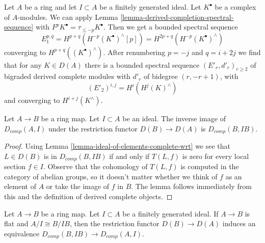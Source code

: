 \begin{example}
\label{example-derived-completion-spectral-sequence}
Let $A$ be a ring and let $I \subset A$ be a finitely generated ideal.
Let $K^\bullet$ be a complex of $A$-modules. We can apply
Lemma \ref{lemma-derived-completion-spectral-sequence}
with $F^pK^\bullet = \tau_{\leq -p}K^\bullet$. Then we get a
bounded spectral sequence
$$
E_1^{p, q} = H^{p + q}(H^{-p}(K^\bullet)^\wedge[p]) =
H^{2p + q}(H^{-p}(K^\bullet)^\wedge)
$$
converging to $H^{p + q}((K^\bullet)^\wedge)$. After renumbering
$p = -j$ and $q = i + 2j$ we find that for any $K \in D(A)$
there is a bounded spectral sequence $(E'_r, d'_r)_{r \geq 2}$
of bigraded derived complete modules with
$d'_r$ of bidegree $(r, -r + 1)$, with
$$
(E'_2)^{i, j} = H^i(H^j(K)^\wedge)
$$
and converging to $H^{i + j}(K^\wedge)$.
\end{example}

\begin{lemma}
\label{lemma-restriction-derived-complete}
Let $A \to B$ be a ring map. Let $I \subset A$ be an ideal. The inverse
image of $D_{comp}(A, I)$ under the restriction functor $D(B) \to D(A)$ is
$D_{comp}(B, IB)$.
\end{lemma}

\begin{proof}
Using Lemma \ref{lemma-ideal-of-elements-complete-wrt}
we see that $L \in D(B)$ is in $D_{comp}(B, IB)$
if and only if $T(L, f)$ is zero for every local section
$f \in I$. Observe that the cohomology of
$T(L, f)$ is computed in the category of abelian groups,
so it doesn't matter whether we think of $f$ as an element of $A$
or take the image of $f$ in $B$.
The lemma follows immediately from this and the
definition of derived complete objects.
\end{proof}

\begin{lemma}
\label{lemma-restriction-derived-complete-equivalence}
Let $A \to B$ be a ring map. Let $I \subset A$ be a finitely generated ideal.
If $A \to B$ is flat and $A/I \cong B/IB$, then the restriction functor
$D(B) \to D(A)$ induces an equivalence
$D_{comp}(B, IB) \to D_{comp}(A, I)$.
\end{lemma}

